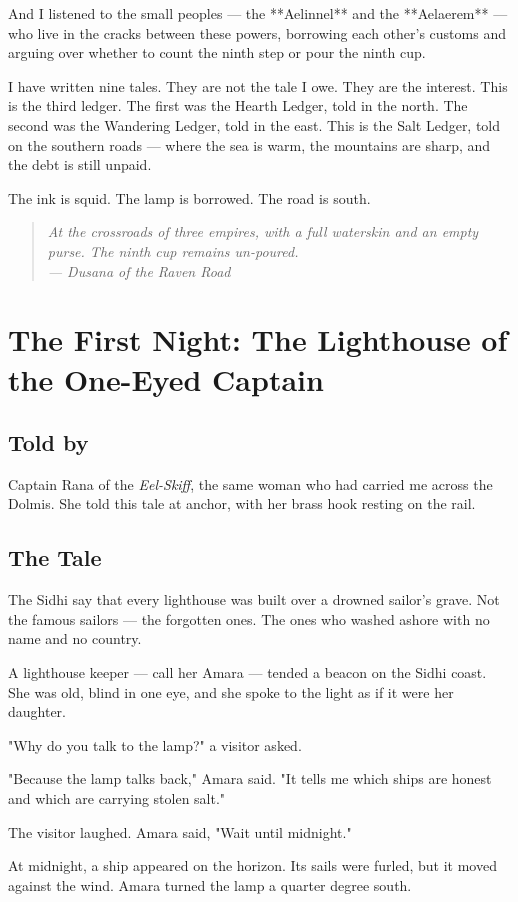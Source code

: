\documentclass[10pt,twoside]{book}
\newcommand{\dusana}[1]{\begin{quote}\itshape #1 \\ --- Dusana of the Raven Road\end{quote}}
\begin{document}
And I listened to the small peoples --- the **Aelinnel** and the **Aelaerem** --- who live in the cracks between these powers, borrowing each other's customs and arguing over whether to count the ninth step or pour the ninth cup.

I have written nine tales. They are not the tale I owe. They are the interest. This is the third ledger. The first was the Hearth Ledger, told in the north. The second was the Wandering Ledger, told in the east. This is the Salt Ledger, told on the southern roads --- where the sea is warm, the mountains are sharp, and the debt is still unpaid.

The ink is squid. The lamp is borrowed. The road is south.

\dusana{At the crossroads of three empires, with a full waterskin and an empty purse. The ninth cup remains un-poured.}

\chapter{The First Night: The Lighthouse of the One-Eyed Captain}

\section*{Told by}
Captain Rana of the \textit{Eel-Skiff}, the same woman who had carried me across the Dolmis. She told this tale at anchor, with her brass hook resting on the rail.

\section*{The Tale}
The Sidhi say that every lighthouse was built over a drowned sailor's grave. Not the famous sailors --- the forgotten ones. The ones who washed ashore with no name and no country.

A lighthouse keeper --- call her Amara --- tended a beacon on the Sidhi coast. She was old, blind in one eye, and she spoke to the light as if it were her daughter.

"Why do you talk to the lamp?" a visitor asked.

"Because the lamp talks back," Amara said. "It tells me which ships are honest and which are carrying stolen salt."

The visitor laughed. Amara said, "Wait until midnight."

At midnight, a ship appeared on the horizon. Its sails were furled, but it moved against the wind. Amara turned the lamp a quarter degree south.
\end{document}
